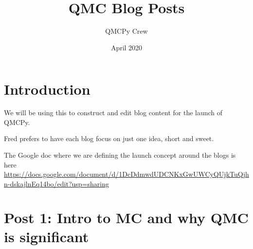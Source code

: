 \documentclass{article}
\title{QMC Blog Posts}
\author{QMCPy Crew}
\date{April 2020}
\begin{document}
\maketitle

\setcounter{tocdepth}{1}
\tableofcontents

\section{Introduction}

We will be using this to construct and edit blog content for the launch of QMCPy.

Fred prefers to have each blog focus on just one idea, short and sweet.

The Google doc where we are defining the launch concept around the blogs is here \url{https://docs.google.com/document/d/1DcDdmwdUDCNKxGwUWCyQUjkTuQjhn-dskajlnEq14bo/edit?usp=sharing}

\section{Post 1: Intro to MC and why QMC is significant}
\end{document}
